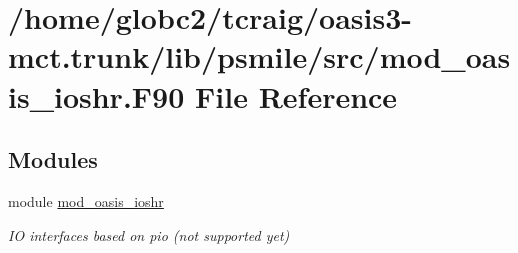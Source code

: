 \hypertarget{mod__oasis__ioshr_8_f90}{}\section{/home/globc2/tcraig/oasis3-\/mct.trunk/lib/psmile/src/mod\+\_\+oasis\+\_\+ioshr.F90 File Reference}
\label{mod__oasis__ioshr_8_f90}
\subsection*{Modules}
\begin{DoxyCompactItemize}
\item 
module \hyperlink{namespacemod__oasis__ioshr}{mod\+\_\+oasis\+\_\+ioshr}
\begin{DoxyCompactList}\small\item\em IO interfaces based on pio (not supported yet) \end{DoxyCompactList}\end{DoxyCompactItemize}
